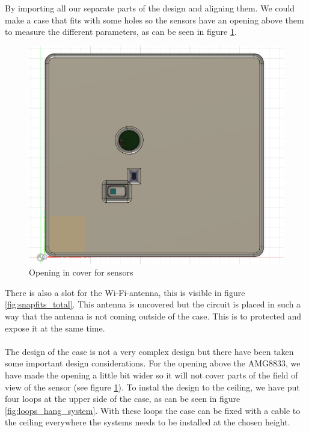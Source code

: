 \documentclass[11pt,a4paper]{article}
\begin{document}
By importing all our separate parts of the design and aligning them. We could make a case that fits with some holes so the sensors have an opening above them to measure the different parameters, as can be seen in figure \ref{fig:opening_sensors}. 
\begin{figure}[H]
	\centering
	\includegraphics[width=1.0\linewidth]{opening_sensors.png}
	\caption{Opening in cover for sensors}
	\label{fig:opening_sensors}
\end{figure}
There is also a slot for the Wi-Fi-antenna, this is visible in figure \ref{fig:snapfits_total}. This antenna is uncovered but the circuit is placed in such a way that the antenna is not coming outside of the case. This is to protected and expose it at the same time.
\\ \\
The design of the case is not a very complex design but there have been taken some important design considerations. For the opening above the AMG8833, we have made the opening a little bit wider so it will not cover parts of the field of view of the sensor (see figure \ref{fig:opening_sensors}). To instal the design to the ceiling, we have put four loops at the upper side of the case, as can be seen in figure \ref{fig:loops_hang_system}. With these loops the case can be fixed with a cable to the ceiling everywhere the systems needs to be installed at the chosen height.
\end{document}
